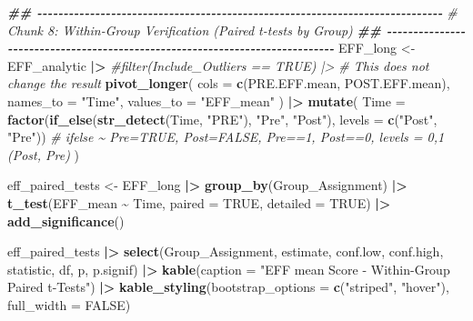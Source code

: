 \documentclass[
]{article}
\newenvironment{Shaded}{\begin{snugshade}}{\end{snugshade}}
\newcommand{\AttributeTok}[1]{\textcolor[rgb]{0.13,0.29,0.53}{#1}}
\newcommand{\CommentTok}[1]{\textcolor[rgb]{0.56,0.35,0.01}{\textit{#1}}}
\newcommand{\ConstantTok}[1]{\textcolor[rgb]{0.56,0.35,0.01}{#1}}
\newcommand{\DocumentationTok}[1]{\textcolor[rgb]{0.56,0.35,0.01}{\textbf{\textit{#1}}}}
\newcommand{\FunctionTok}[1]{\textcolor[rgb]{0.13,0.29,0.53}{\textbf{#1}}}
\newcommand{\NormalTok}[1]{#1}
\newcommand{\OtherTok}[1]{\textcolor[rgb]{0.56,0.35,0.01}{#1}}
\newcommand{\SpecialCharTok}[1]{\textcolor[rgb]{0.81,0.36,0.00}{\textbf{#1}}}
\newcommand{\StringTok}[1]{\textcolor[rgb]{0.31,0.60,0.02}{#1}}
\begin{document}
\begin{Shaded}
\begin{Highlighting}[]
\DocumentationTok{\#\# {-}{-}{-}{-}{-}{-}{-}{-}{-}{-}{-}{-}{-}{-}{-}{-}{-}{-}{-}{-}{-}{-}{-}{-}{-}{-}{-}{-}{-}{-}{-}{-}{-}{-}{-}{-}{-}{-}{-}{-}{-}{-}{-}{-}{-}{-}{-}{-}{-}{-}{-}{-}{-}{-}{-}{-}{-}{-}{-}{-}{-}{-}{-}{-}{-}{-}{-}{-}{-}{-}{-}{-}{-}{-}{-}{-}{-}}
\CommentTok{\# Chunk 8: Within{-}Group Verification (Paired t{-}tests by Group)}
\DocumentationTok{\#\# {-}{-}{-}{-}{-}{-}{-}{-}{-}{-}{-}{-}{-}{-}{-}{-}{-}{-}{-}{-}{-}{-}{-}{-}{-}{-}{-}{-}{-}{-}{-}{-}{-}{-}{-}{-}{-}{-}{-}{-}{-}{-}{-}{-}{-}{-}{-}{-}{-}{-}{-}{-}{-}{-}{-}{-}{-}{-}{-}{-}{-}{-}{-}{-}{-}{-}{-}{-}{-}{-}{-}{-}{-}{-}{-}{-}{-}}
\NormalTok{EFF\_long }\OtherTok{\textless{}{-}}\NormalTok{ EFF\_analytic }\SpecialCharTok{|\textgreater{}} 
  \CommentTok{\#filter(Include\_Outliers == TRUE) |\textgreater{} \# This does not change the result}
  \FunctionTok{pivot\_longer}\NormalTok{(}
    \AttributeTok{cols =} \FunctionTok{c}\NormalTok{(PRE.EFF.mean, POST.EFF.mean),}
    \AttributeTok{names\_to =} \StringTok{"Time"}\NormalTok{,}
    \AttributeTok{values\_to =} \StringTok{"EFF\_mean"}
\NormalTok{  ) }\SpecialCharTok{|\textgreater{}} 
  \FunctionTok{mutate}\NormalTok{(}
    \AttributeTok{Time =} \FunctionTok{factor}\NormalTok{(}\FunctionTok{if\_else}\NormalTok{(}\FunctionTok{str\_detect}\NormalTok{(Time, }\StringTok{"PRE"}\NormalTok{), }\StringTok{"Pre"}\NormalTok{, }\StringTok{"Post"}\NormalTok{), }\AttributeTok{levels =} \FunctionTok{c}\NormalTok{(}\StringTok{"Post"}\NormalTok{, }\StringTok{"Pre"}\NormalTok{)) }\CommentTok{\# ifelse \textasciitilde{} Pre=TRUE, Post=FALSE, Pre==1, Post==0, levels = 0,1 (Post, Pre)}
\NormalTok{  )}

\NormalTok{eff\_paired\_tests }\OtherTok{\textless{}{-}}\NormalTok{ EFF\_long }\SpecialCharTok{|\textgreater{}} 
  \FunctionTok{group\_by}\NormalTok{(Group\_Assignment) }\SpecialCharTok{|\textgreater{}} 
  \FunctionTok{t\_test}\NormalTok{(EFF\_mean }\SpecialCharTok{\textasciitilde{}}\NormalTok{ Time, }\AttributeTok{paired =} \ConstantTok{TRUE}\NormalTok{, }\AttributeTok{detailed =} \ConstantTok{TRUE}\NormalTok{) }\SpecialCharTok{|\textgreater{}} 
  \FunctionTok{add\_significance}\NormalTok{()}

\NormalTok{eff\_paired\_tests }\SpecialCharTok{|\textgreater{}} 
  \FunctionTok{select}\NormalTok{(Group\_Assignment, estimate, conf.low, conf.high, statistic, df, p, p.signif) }\SpecialCharTok{|\textgreater{}} 
  \FunctionTok{kable}\NormalTok{(}\AttributeTok{caption =} \StringTok{"EFF mean Score {-} Within{-}Group Paired t{-}Tests"}\NormalTok{) }\SpecialCharTok{|\textgreater{}} 
  \FunctionTok{kable\_styling}\NormalTok{(}\AttributeTok{bootstrap\_options =} \FunctionTok{c}\NormalTok{(}\StringTok{"striped"}\NormalTok{, }\StringTok{"hover"}\NormalTok{), }\AttributeTok{full\_width =} \ConstantTok{FALSE}\NormalTok{)}
\end{Highlighting}
\end{Shaded}
\end{document}
